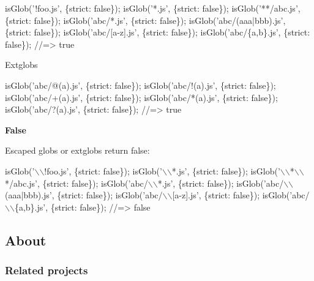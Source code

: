 \begin{DoxyCode}
isGlob('!foo.js', \{strict: false\});
isGlob('*.js', \{strict: false\});
isGlob('**/abc.js', \{strict: false\});
isGlob('abc/*.js', \{strict: false\});
isGlob('abc/(aaa|bbb).js', \{strict: false\});
isGlob('abc/[a-z].js', \{strict: false\});
isGlob('abc/\{a,b\}.js', \{strict: false\});
//=> true
\end{DoxyCode}


Extglobs


\begin{DoxyCode}
isGlob('abc/@(a).js', \{strict: false\});
isGlob('abc/!(a).js', \{strict: false\});
isGlob('abc/+(a).js', \{strict: false\});
isGlob('abc/*(a).js', \{strict: false\});
isGlob('abc/?(a).js', \{strict: false\});
//=> true
\end{DoxyCode}


{\bfseries False}

Escaped globs or extglobs return {\ttfamily false}\+:


\begin{DoxyCode}
isGlob('\(\backslash\)\(\backslash\)!foo.js', \{strict: false\});
isGlob('\(\backslash\)\(\backslash\)*.js', \{strict: false\});
isGlob('\(\backslash\)\(\backslash\)*\(\backslash\)\(\backslash\)*/abc.js', \{strict: false\});
isGlob('abc/\(\backslash\)\(\backslash\)*.js', \{strict: false\});
isGlob('abc/\(\backslash\)\(\backslash\)(aaa|bbb).js', \{strict: false\});
isGlob('abc/\(\backslash\)\(\backslash\)[a-z].js', \{strict: false\});
isGlob('abc/\(\backslash\)\(\backslash\)\{a,b\}.js', \{strict: false\});
//=> false
\end{DoxyCode}


\subsection*{About}

\subsubsection*{Related projects}


